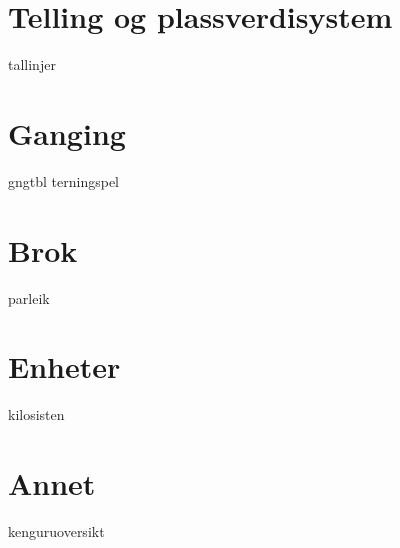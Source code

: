 





\cont{\tableofcontents}

\section{Telling og plassverdisystem}
\newpage
{tallinjer}

\section{Ganging}
\newpage
{gngtbl}
\newpage
{terningspel}
\newpage

\section{Brok}
\newpage
{parleik}
\newpage

\section{Enheter}
\newpage
{kilosisten}
\newpage

\section{Annet}
\newpage
{kenguruoversikt}







